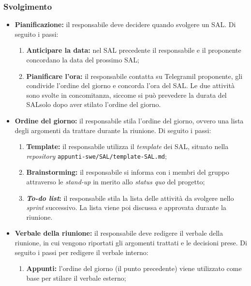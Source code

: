 \subsubsection{Svolgimento}
\begin{itemize}

	\item \textbf{Pianificazione:} il responsabile deve decidere quando svolgere
	      un SAL\g. Di seguito i passi:
	      \begin{enumerate}
		      \item \textbf{Anticipare la data:} nel SAL\g
		            precedente il responsabile e il proponente concordano
		            la data del prossimo SAL\g;

		      \item \textbf{Pianificare l'ora:} il responsabile contatta su
		            Telegram\g il proponente, gli condivide l'ordine del
		            giorno e concorda l'ora del SAL\g. Le due attività
		            sono svolte in concomitanza, siccome si può prevedere la
		            durata del SAL\g solo dopo aver stilato l'ordine del
		            giorno.
	      \end{enumerate}

	\item \textbf{Ordine del giorno:} il responsabile stila l'ordine del
	      giorno, ovvero una lista degli argomenti da trattare durante la
	      riunione. Di seguito i passi:
	      \begin{enumerate}
		      \item \textbf{Template:} il responsabile utilizza il \textit{template}
		            dei SAL\g, situato nella \textit{repository\g}
		            \texttt{appunti-swe/SAL/template-SAL.md};

		      \item \textbf{Brainstorming:} il responsabile si informa con i
		            membri del gruppo attraverso le \textit{stand-up} in merito
		            allo \textit{status quo} del progetto;

		      \item \textbf{\textit{To-do list}:} il responsabile stila la lista
		            delle attività da svolgere nello \textit{sprint} successivo. La
		            lista viene poi discussa e approvata durante la riunione.
	      \end{enumerate}

	\item \textbf{Verbale della riunione:} il responsabile deve redigere il
	      verbale della riunione, in cui vengono riportati gli argomenti
	      trattati e le decisioni prese. Di seguito i passi per redigere il
	      verbale interno:
	      \begin{enumerate}
		      \item \textbf{Appunti:} l'ordine del giorno (il punto precedente)
		            viene utilizzato come base per stilare il verbale esterno;


\end{enumerate}
\end{itemize}
